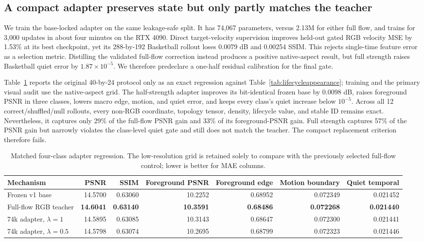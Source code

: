 \documentclass[10pt]{article}
\begin{document}
\subsection{A compact adapter preserves state but only partly matches the teacher}

We train the base-locked adapter on the same leakage-safe split. It has 74,067 parameters, versus
2.13M for either full flow, and trains for 3,000 updates in about four minutes on the RTX 4090.
Direct target-velocity supervision improves held-out gated RGB velocity MSE by 1.53\% at its best
checkpoint, yet its 288-by-192 Basketball rollout loses 0.0079 dB and 0.00254 SSIM. This rejects
single-time feature error as a selection metric. Distilling the validated full-flow correction
instead produces a positive native-aspect result, but full strength raises Basketball quiet error
by $1.87\times10^{-5}$. We therefore predeclare a one-half residual calibration for the final gate.

Table~\ref{tab:appearanceadapter} reports the original 40-by-24 protocol only as an exact regression
against Table~\ref{tab:lifecycleappearance}; training and the primary visual audit use the
native-aspect grid. The half-strength adapter improves its bit-identical frozen base by 0.0098 dB,
raises foreground PSNR in three classes, lowers macro edge, motion, and quiet error, and keeps every
class's quiet increase below $10^{-5}$. Across all 12 correct/shuffled/null rollouts, every non-RGB
coordinate, topology tensor, density, lifecycle value, and stable ID remains exact. Nevertheless,
it captures only 29\% of the full-flow PSNR gain and 33\% of its foreground-PSNR gain. Full strength
captures 57\% of the PSNR gain but narrowly violates the class-level quiet gate and still does not
match the teacher. The compact replacement criterion therefore fails.

\begin{table}[H]
\centering
\footnotesize
\caption{Matched four-class adapter regression. The low-resolution grid is retained solely to
compare with the previously selected full-flow control; lower is better for MAE columns.}
\label{tab:appearanceadapter}
\begin{tabularx}{\linewidth}{@{}Xrrrrrr@{}}
\toprule
Mechanism & PSNR & SSIM & Foreground PSNR & Foreground edge & Motion boundary & Quiet temporal \\
\midrule
Frozen v1 base & 14.5700 & 0.63060 & 10.2252 & 0.68952 & 0.072349 & 0.021452 \\
Full-flow RGB teacher & \textbf{14.6041} & \textbf{0.63140} & \textbf{10.3591} & \textbf{0.68486} & \textbf{0.072268} & \textbf{0.021440} \\
74k adapter, $\lambda=1$ & 14.5895 & 0.63085 & 10.3143 & 0.68647 & 0.072300 & 0.021441 \\
74k adapter, $\lambda=0.5$ & 14.5798 & 0.63074 & 10.2695 & 0.68799 & 0.072323 & 0.021446 \\
\bottomrule
\end{tabularx}
\end{table}
\end{document}
